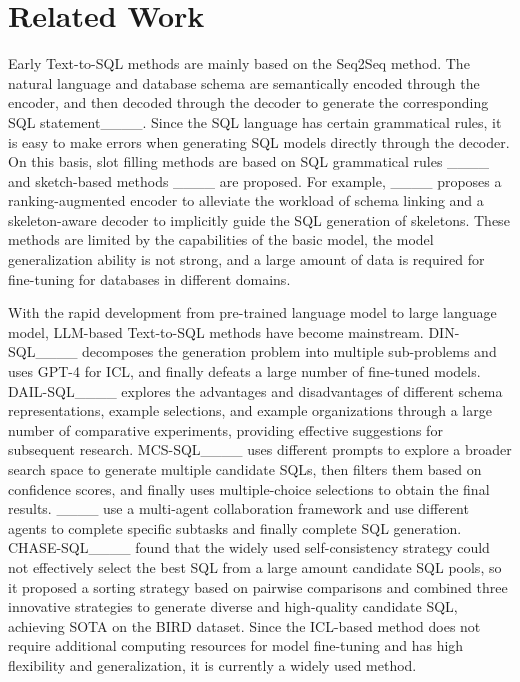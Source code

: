 \section{Related Work}
\label{sec:related_works}
Early Text-to-SQL methods are mainly based on the Seq2Seq method. The natural language and database schema are semantically encoded through the encoder, and then decoded through the decoder to generate the corresponding SQL statement____. Since the SQL language has certain grammatical rules, it is easy to make errors when generating SQL models directly through the decoder. On this basis, slot filling methods are based on SQL grammatical rules ____ and sketch-based methods ____ are proposed. For example, ____ proposes a ranking-augmented encoder to alleviate the workload of schema linking and a skeleton-aware decoder to implicitly guide the SQL generation of skeletons. These methods are limited by the capabilities of the basic model, the model generalization ability is not strong, and a large amount of data is required for fine-tuning for databases in different domains.

With the rapid development from pre-trained language model to large language model, LLM-based Text-to-SQL methods have become mainstream. DIN-SQL____ decomposes the generation problem into multiple sub-problems  and uses GPT-4 for ICL, and finally defeats a large number of fine-tuned models. DAIL-SQL____ explores the advantages and disadvantages of different schema representations, example selections, and example organizations through a large number of comparative experiments, providing effective suggestions for subsequent research. MCS-SQL____ uses different prompts to explore a broader search space to generate multiple candidate SQLs, then filters them based on confidence scores, and finally uses multiple-choice selections to obtain the final results. ____ use a multi-agent collaboration framework and use different agents to complete specific subtasks and finally complete SQL generation. CHASE-SQL____ found that the widely used self-consistency strategy could not effectively select the best SQL from a large amount candidate SQL pools, so it proposed a sorting strategy based on pairwise comparisons and combined three innovative strategies to generate diverse and high-quality candidate SQL, achieving SOTA on the BIRD dataset. Since the ICL-based method does not require additional computing resources for model fine-tuning and has high flexibility and generalization, it is currently a widely used method.

